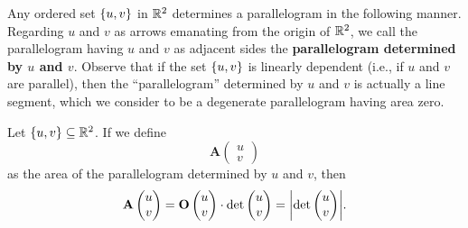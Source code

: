 \begin{defn}\label{4.1.3}
	Any ordered set \(\left\lbrace u, v\right\rbrace\) in \(\mathbb{R}^2\) determines a parallelogram in the following manner.
	Regarding \(u\) and \(v\) as arrows emanating from the origin of \(\mathbb{R}^2\), we call the parallelogram having \(u\) and \(v\) as adjacent sides the \textbf{parallelogram determined by \(u\) and \(v\)}.
	Observe that if the set \(\left\lbrace u, v\right\rbrace\) is linearly dependent (i.e., if \(u\) and \(v\) are parallel), then the ``parallelogram'' determined by \(u\) and \(v\) is actually a line segment, which we consider to be a degenerate parallelogram having area zero.
\end{defn}

\begin{prop}\label{4.1.4}
	Let \(\left\lbrace u, v\right\rbrace \subseteq \mathbb{R}^2\).
	If we define
	\[
		\mathbf{A}\begin{pmatrix}
			u \\
			v
		\end{pmatrix}
	\]
	as the area of the parallelogram determined by \(u\) and \(v\), then
	\[
		\mathbf{A}\begin{pmatrix}
			u \\
			v
		\end{pmatrix} = \mathbf{O}\begin{pmatrix}
			u \\
			v
		\end{pmatrix} \cdot \det\begin{pmatrix}
			u \\
			v
		\end{pmatrix} = \abs{\det\begin{pmatrix}
				u \\
				v
			\end{pmatrix}}.
	\]
\end{prop}


